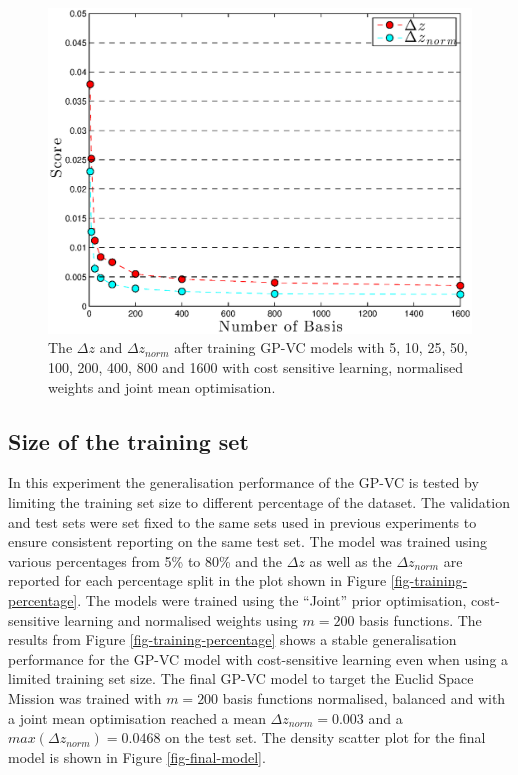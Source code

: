 \documentclass[useAMS,usenatbib,fleqn]{mn2e}
\begin{document}
\begin{figure}
       \centering
       \includegraphics[width=\columnwidth]{figures/1600.eps}
        \caption{The $\Delta z$ and $\Delta z_{norm}$ after training GP-VC models with 5, 10, 25, 50, 100, 200, 400, 800 and 1600 with cost sensitive learning, normalised weights and joint mean optimisation. }
       \label{fig-1600}
\end{figure}

\subsection{Size of the training set}

In this experiment the generalisation performance of the GP-VC is tested by limiting the training set size to different percentage of the dataset. The validation and test sets were set fixed to the same sets used in previous experiments to ensure consistent reporting on the same test set. The model was trained using various percentages from 5\% to 80\% and the $\Delta z$ as well as the $\Delta z_{norm}$ are reported for each percentage split in the plot shown in Figure \ref{fig-training-percentage}. The models were trained using the ``Joint'' prior optimisation, cost-sensitive learning and normalised weights using $m=200$ basis functions. The results from Figure \ref{fig-training-percentage} shows a stable generalisation performance for the GP-VC model with cost-sensitive learning even when using a limited training set size. The final GP-VC model to target the Euclid Space Mission was trained with $m=200$ basis functions normalised, balanced and with a joint mean optimisation reached a mean $\Delta z_{norm}=0.003$ and a $max\left(\Delta z_{norm}\right)=0.0468$ on the test set. The density scatter plot for the final model is shown in Figure \ref{fig-final-model}.
\end{document}
